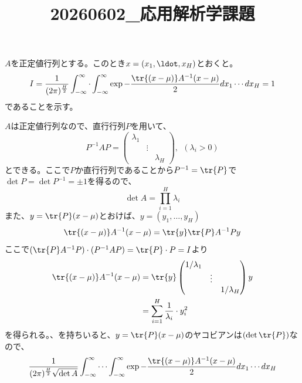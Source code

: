 

\title{20260602_応用解析学課題}
\date{}


\begin{tcolorbox} %
$A$を正定値行列とする。このとき$x= (x_1, \ldot, x_H)$とおくと。
\begin{equation*}
    I= \frac{1}{(2\pi)^\frac{H}{2}}\int_{-\infty}^\infty\cdot \int_{-\infty}^\infty \exp{-\frac{\tr{(x- \mu)}A^{-1}(x- \mu)}{2}}dx_1\cdots dx_H= 1
\end{equation*}
    であることを示す。
\end{tcolorbox} %

\begin{answer}
    $A$は正定値行列なので、直行行列$P$を用いて、
\begin{equation*}
    P^{-1}AP= 
\begin{pmatrix}
    \lambda_1& & \\
    & \vdots& \\
    & & \lambda_H
\end{pmatrix},\ \ (\lambda_i> 0)
\end{equation*}    
    とできる。ここで$P$か直行行列であることから$P^{-1}= \tr{P}$で$\det{P}= \det{P^{-1}}= \pm 1$を得るので、
\begin{equation*} \label{eq:detの定義}
    \det{A}= \prod_{i= 1}^H \lambda_i
\end{equation*}
    また、$y= \tr{P}(x- \mu)$とおけば、$y= (y_1, \ldots, y_H)$
\begin{equation*}
    \tr{(x- \mu)}A^{-1}(x- \mu)= \tr{y}\tr{P}A^{-1}Py
\end{equation*}
    ここで$(\tr{P}A^{-1}P)\cdot (P^{-1}AP)= \tr{P}\cdot P= I$より
\begin{align} \label{eq:行列をyで挟む}
    \tr{(x- \mu)}A^{-1}(x- \mu)
    &= \tr{y}
    \begin{pmatrix}
    1/\lambda_1& & \\
    & \vdots& \\
    & & 1/\lambda_H
    \end{pmatrix}
    y\\
    &= \sum_{i= 1}^H \frac{1}{\lambda_i}\cdot y^2_i
\end{align}
    を得られる。、を持ちいると、$y= \tr{P}(x- \mu)$のヤコビアンは$(\det{\tr{P}})$なので、
\begin{align}
    \frac{1}{(2\pi)^\frac{H}{2}\sqrt{\det{A}}}\int_{-\infty}^\infty\cdots \int_{-\infty}^\infty \exp{-\frac{\tr{(x- \mu)}A^{-1}(x- \mu)}{2}}dx_1\cdots dx_H

\end{align}
\end{answer}
